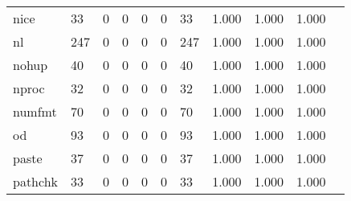 \begin{longtable}{lp{1.10cm}p{1.10cm}p{1.10cm}p{1.10cm}p{1.10cm}p{1.10cm}p{1.10cm}p{1.10cm}p{1.10cm}p{1.10cm}}
nice      &                     33 &                                  0 &                                 0 &                                0 &                                 0 &                              33 &                          1.000 &                                 1.000 &                               1.000 \\
nl        &                    247 &                                  0 &                                 0 &                                0 &                                 0 &                             247 &                          1.000 &                                 1.000 &                               1.000 \\
nohup     &                     40 &                                  0 &                                 0 &                                0 &                                 0 &                              40 &                          1.000 &                                 1.000 &                               1.000 \\
nproc     &                     32 &                                  0 &                                 0 &                                0 &                                 0 &                              32 &                          1.000 &                                 1.000 &                               1.000 \\
numfmt    &                     70 &                                  0 &                                 0 &                                0 &                                 0 &                              70 &                          1.000 &                                 1.000 &                               1.000 \\
od        &                     93 &                                  0 &                                 0 &                                0 &                                 0 &                              93 &                          1.000 &                                 1.000 &                               1.000 \\
paste     &                     37 &                                  0 &                                 0 &                                0 &                                 0 &                              37 &                          1.000 &                                 1.000 &                               1.000 \\
pathchk   &                     33 &                                  0 &                                 0 &                                0 &                                 0 &                              33 &                          1.000 &                                 1.000 &                               1.000 \\

\end{longtable}
